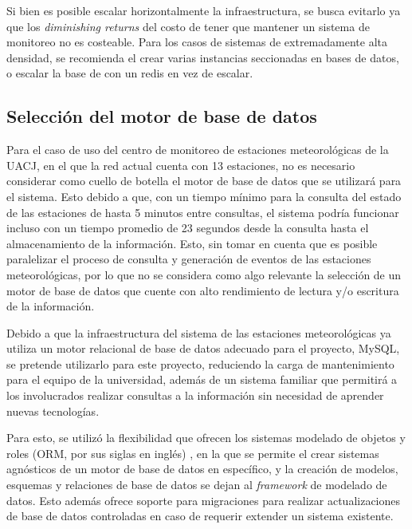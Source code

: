 Si bien es posible escalar horizontalmente la infraestructura, se busca evitarlo ya que los \textit{diminishing returns} del costo de tener que mantener un sistema de monitoreo no es costeable. Para los casos de sistemas de extremadamente alta densidad, se recomienda el crear varias instancias seccionadas en bases de datos, o escalar la base de con un redis en vez de escalar.



\subsection{Selección del motor de base de datos}

Para el caso de uso del centro de monitoreo de estaciones meteorológicas de la UACJ, en el que la red actual cuenta con 13 estaciones, no es necesario considerar como cuello de botella el motor de base de datos que se utilizará para el sistema. Esto debido a que, con un tiempo mínimo para la consulta del estado de las estaciones de hasta 5 minutos entre consultas, el sistema podría funcionar incluso con un tiempo promedio de 23 segundos desde la consulta hasta el almacenamiento de la información. Esto, sin tomar en cuenta que es posible paralelizar el proceso de consulta y generación de eventos de las estaciones meteorológicas, por lo que no se considera como algo relevante la selección de un motor de base de datos que cuente con alto rendimiento de lectura y/o escritura de la información.

Debido a que la infraestructura del sistema de las estaciones meteorológicas ya utiliza un motor relacional de base de datos adecuado para el proyecto, MySQL, se pretende utilizarlo para este proyecto, reduciendo la carga de mantenimiento para el equipo de la universidad, además de un sistema familiar que permitirá a los involucrados realizar consultas a la información sin necesidad de aprender nuevas tecnologías.

Para esto, se utilizó la flexibilidad que ofrecen los sistemas modelado de objetos y roles (ORM, por sus siglas en inglés) \cite{Halpin2006}, en la que se permite el crear sistemas agnósticos de un motor de base de datos en específico, y la creación de modelos, esquemas y relaciones de base de datos se dejan al \textit{framework} de modelado de datos. Esto además ofrece soporte para migraciones para realizar actualizaciones de base de datos controladas en caso de requerir extender un sistema existente.

